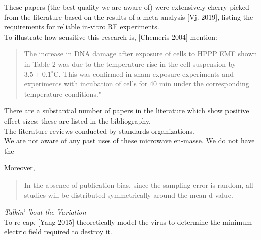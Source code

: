 \documentclass[fleqn,10pt]{article}
\begin{document}
\begin{autem}

These papers (the best quality we are aware of) were extensively cherry-picked from the literature based on the results of a meta-analysis [Vj. 2019], listing the requirements for reliable in-vitro RF experiments.\\

To illustrate how sensitive this research is, [Chemeris 2004] mention:

\begin{quote}

The increase in DNA damage after exposure of cells to HPPP EMF shown in Table 2 was due to the temperature rise in the cell suspension by $3.5\pm0.1^{\circ}  $C. This was confirmed in sham-exposure experiments and experiments with incubation of cells for 40 min under the corresponding temperature conditions."

\end{quote}

There are a substantial number of papers in the literature which show positive effect sizes; these are listed in the bibliography. \\

The literature reviews conducted by standards organizations.\\

We are not aware of any past uses of these microwave en-masse. We do not have the 

Moreover, 
\begin{quote}
	
In the absence of publication bias, since the sampling error is random, all studies will be distributed symmetrically around the mean d value.

\end{quote}


\end{autem}





\clearpage
\printbibliography[heading=none, title={}, keyword={Flagship}]
\printbibliography[heading=none, title={}, keyword={standards}]






\clearpage
{\Large \it Talkin' 'bout the Variation}\\

To re-cap, [Yang 2015] theoretically model the virus to determine the minimum electric field required to destroy it. 
\end{document}
